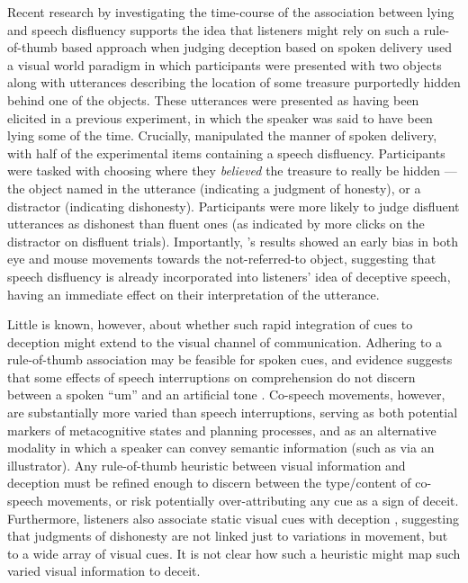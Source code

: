 \documentclass[a4paper,man,natbib]{apa6}
\newcommand*{\spex}[1]{``{#1}''} %
\begin{document}
Recent research by \citet{Loy2017} investigating the time-course of the association between lying and speech disfluency supports the idea that listeners might rely on such a rule-of-thumb based approach when judging deception based on spoken delivery
\citet{Loy2017} used a visual world paradigm in which participants were presented with two objects along with utterances describing the location of some treasure purportedly hidden behind one of the objects.
These utterances were presented as having been elicited in a previous experiment, in which the speaker was said to have been lying some of the time.
Crucially, \citet{Loy2017} manipulated the manner of spoken delivery, with half of the experimental items containing a speech disfluency.
Participants were tasked with choosing where they \textit{believed} the treasure to really be hidden --- the object named in the utterance (indicating a judgment of honesty), or a distractor (indicating dishonesty).
Participants were more likely to judge disfluent utterances as dishonest than fluent ones (as indicated by more clicks on the distractor on disfluent trials). 
Importantly, \citeauthor{Loy2017}'s results showed an early bias in both eye and mouse movements towards the not-referred-to object, suggesting that speech disfluency is already incorporated into listeners' idea of deceptive speech, having an immediate effect on their interpretation of the utterance. 

Little is known, however, about whether such rapid integration of cues to deception might extend to the visual channel of communication. 
Adhering to a rule-of-thumb association may be feasible for spoken cues, and evidence suggests that some effects of speech interruptions on comprehension do not discern between a spoken \spex{um} and an artificial tone \citep{Corley2011}.
Co-speech movements, however, are substantially more varied than speech interruptions, serving as both potential markers of metacognitive states and planning processes, and as an alternative modality in which a speaker can convey semantic information (such as via an illustrator).
Any rule-of-thumb heuristic between visual information and deception must be refined enough to discern between the type/content of co-speech movements, or risk potentially over-attributing any cue as a sign of deceit.
Furthermore, listeners also associate static visual cues with deception \citep[e.g. eye-gaze,][]{Zuckerman1981a}, suggesting that judgments of dishonesty are not linked just to variations in movement, but to a wide array of visual cues. 
It is not clear how such a heuristic might map such varied visual information to deceit.
\end{document}
